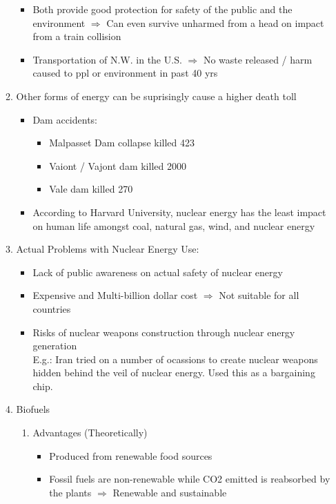 \documentclass[oneside]{book}
\begin{document}
\begin{enumerate}
\begin{enumerate}
\begin{itemize}
            \item Both provide good protection for safety of the public and the environment \( \Rightarrow \) Can even survive unharmed from a head on impact from a train collision
            \item Transportation of N.W. in the U.S. \( \Rightarrow \) No waste released / harm caused to ppl or environment in past 40 yrs
        \end{itemize}
        \item Other forms of energy can be suprisingly cause a higher death toll \begin{itemize}
            \item Dam accidents: \begin{itemize}
                \item Malpasset Dam collapse killed 423
                \item Vaiont / Vajont dam killed 2000 
                \item Vale dam killed 270
            \end{itemize}
            \item According to Harvard University, nuclear energy has the least impact on human life amongst coal, natural gas, wind, and nuclear energy
        \end{itemize}
        \item Actual Problems with Nuclear Energy Use: \begin{itemize}
            \item Lack of public awareness on actual safety of nuclear energy
            \item Expensive and Multi-billion dollar cost \( \Rightarrow \) Not suitable for all countries
            \item Risks of nuclear weapons construction through nuclear energy generation\\
            E.g.: Iran tried on a number of ocassions to create nuclear weapons hidden behind the veil of nuclear energy. Used this as a bargaining chip.
        \end{itemize}
        \item Biofuels
        \begin{enumerate}
            \item Advantages (Theoretically) \begin{itemize}
                \item Produced from renewable food sources 
                \item Fossil fuels are non-renewable while CO2 emitted is reabsorbed by the plants \( \Rightarrow \) Renewable and sustainable

\end{itemize}
\end{enumerate}
\end{enumerate}
\end{enumerate}
\end{document}
